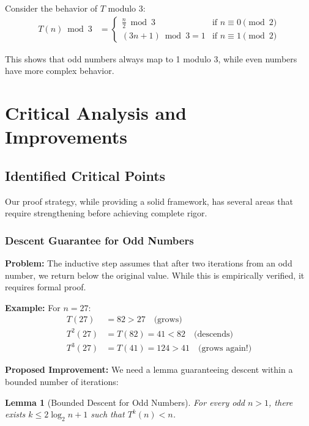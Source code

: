 \documentclass[11pt,a4paper]{article}
\newtheorem{lemma}[theorem]{Lemma}
\begin{document}
\begin{example}[Modular Analysis for $m = 3$]
Consider the behavior of $T$ modulo 3:
\begin{align*}
T(n) \bmod 3 &= \begin{cases}
\frac{n}{2} \bmod 3 & \text{if } n \equiv 0 \pmod{2} \\
(3n + 1) \bmod 3 = 1 & \text{if } n \equiv 1 \pmod{2}
\end{cases}
\end{align*}

This shows that odd numbers always map to 1 modulo 3, while even numbers have more complex behavior.
\end{example}

\section{Critical Analysis and Improvements}

\subsection{Identified Critical Points}

Our proof strategy, while providing a solid framework, has several areas that require strengthening before achieving complete rigor.

\subsubsection{Descent Guarantee for Odd Numbers}

\textbf{Problem:} The inductive step assumes that after two iterations from an odd number, we return below the original value. While this is empirically verified, it requires formal proof.

\textbf{Example:} For $n = 27$:
\begin{align*}
T(27) &= 82 > 27 \quad \text{(grows)} \\
T^2(27) &= T(82) = 41 < 82 \quad \text{(descends)} \\
T^3(27) &= T(41) = 124 > 41 \quad \text{(grows again!)}
\end{align*}

\textbf{Proposed Improvement:} We need a lemma guaranteeing descent within a bounded number of iterations:

\begin{lemma}[Bounded Descent for Odd Numbers]
For every odd $n > 1$, there exists $k \leq 2\log_2 n + 1$ such that $T^k(n) < n$.
\end{lemma}
\end{document}
